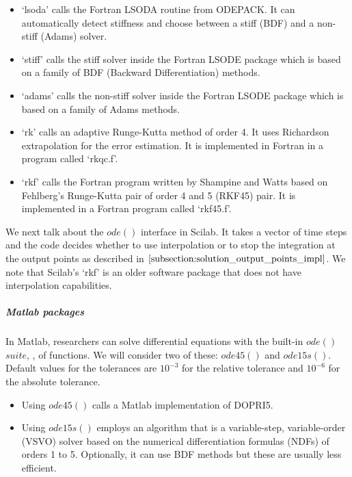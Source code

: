 \begin{itemize}
\item `lsoda' calls the Fortran LSODA routine from ODEPACK. It can automatically detect stiffness and choose between a stiff (BDF) and a non-stiff (Adams) solver.

\item `stiff' calls the stiff solver inside the Fortran LSODE package which is based on a family of BDF (Backward Differentiation) methods.

\item `adams' calls the non-stiff solver inside the Fortran LSODE package which is based on a family of Adams methods.

\item `rk' calls an adaptive Runge-Kutta method of order 4. It uses Richardson extrapolation for the error estimation. It is implemented in Fortran in a program called `rkqc.f'.

\item `rkf' calls the Fortran program written by Shampine and Watts based on Fehlberg's Runge-Kutta pair of order 4 and 5 (RKF45) pair. It is implemented in a Fortran program called `rkf45.f'.
\end{itemize}

We next talk about the $ode()$ interface in Scilab. It takes a vector of time steps and the code decides whether to use interpolation or to stop the integration at the output points as described in $\ref{subsection:solution_output_points_impl}$. We note that Scilab's `rkf' is an older software package that does not have interpolation capabilities.

\subparagraph{Matlab packages}
In Matlab, researchers can solve differential equations with the built-in $ode()$ $suite$, \cite{shampine1997matlab}, of functions. We will consider two of these: $ode45()$ and $ode15s()$.
Default values for the tolerances are $10^{-3}$ for the relative tolerance and $10^{-6}$ for the absolute tolerance.

\begin{itemize}
\item Using $ode45()$ calls a Matlab implementation of DOPRI5.

\item Using $ode15s()$ employs an algorithm that is a variable-step, variable-order (VSVO) solver based on the numerical differentiation formulas (NDFs) of orders 1 to 5. Optionally, it can use BDF methods but these are usually less efficient.
\end{itemize}

